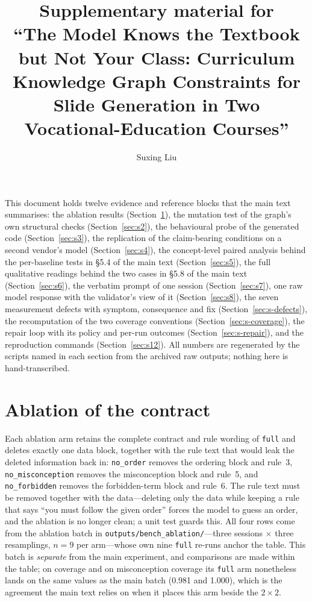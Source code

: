 \documentclass[11pt,a4paper]{article}
\newcommand{\id}[1]{\texttt{#1}}
\begin{document}
\title{\textbf{Supplementary material for}\\[2pt]
``The Model Knows the Textbook but Not Your Class: Curriculum Knowledge
Graph Constraints for Slide Generation in Two Vocational-Education Courses''}
\author{Suxing Liu}
\date{}

\maketitle

\noindent This document holds twelve evidence and reference blocks that the main
text summarises: the ablation results (Section~\ref{sec:s1}), the mutation test
of the graph's own structural checks (Section~\ref{sec:s2}), the behavioural
probe of the generated code (Section~\ref{sec:s3}), the replication of the
claim-bearing conditions on a second vendor's model (Section~\ref{sec:s4}), the
concept-level paired analysis behind the per-baseline tests in \S5.4 of the main
text (Section~\ref{sec:s5}), the full qualitative readings behind the two cases
in \S5.8 of the main text (Section~\ref{sec:s6}), the verbatim prompt of one
session (Section~\ref{sec:s7}), one raw model response with the validator's view
of it (Section~\ref{sec:s8}), the seven measurement defects with symptom,
consequence and fix (Section~\ref{sec:s-defects}), the recomputation of the two
coverage conventions (Section~\ref{sec:s-coverage}), the repair loop with its
policy and per-run outcomes (Section~\ref{sec:s-repair}), and the reproduction
commands (Section~\ref{sec:s12}). All numbers are regenerated by the scripts
named in each section from the archived raw outputs; nothing here is
hand-transcribed.

\section{Ablation of the contract}
\label{sec:s1}

Each ablation arm retains the complete contract and rule wording of \id{full}
and deletes exactly one data block, together with the rule text that would leak
the deleted information back in: \id{no\_order} removes the ordering block and
rule~3, \id{no\_misconception} removes the misconception block and rule~5, and
\id{no\_forbidden} removes the forbidden-term block and rule~6. The rule text
must be removed together with the data---deleting only the data while keeping a
rule that says ``you must follow the given order'' forces the model to guess an
order, and the ablation is no longer clean; a unit test guards this. All four
rows come from the ablation batch in \id{outputs/bench\_ablation/}---three
sessions $\times$ three resamplings, $n=9$ per arm---whose own nine \id{full}
re-runs anchor the table. This batch is \emph{separate} from the main
experiment, and comparisons are made within the table; on coverage and on
misconception coverage its \id{full} arm nonetheless lands on the same values as
the main batch (0.981 and 1.000), which is the agreement the main text relies on
when it places this arm beside the $2\times2$.
\end{document}
